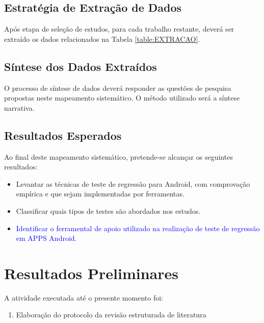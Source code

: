 \subsection{Estratégia de Extração de Dados}

Após etapa de seleção de estudos, para cada trabalho restante, deverá ser extraído os dados relacionados na Tabela \ref{table:EXTRACAO}.



\subsection{Síntese dos Dados Extraídos}

O processo de síntese de dados deverá responder as questões de pesquisa propostas neste mapeamento sistemático. O método utilizado será a síntese narrativa.


\subsection{Resultados Esperados}

Ao final deste mapeamento sistemático, pretende-se alcançar os seguintes resultados:

\begin{itemize}
    \item Levantar as técnicas de teste de regressão para Android, com comprovação empírica e que sejam implementadas por ferramentas.
    
    \item Classificar quais tipos de testes são abordados nos estudos.
    
    \item \textcolor{blue}{Identificar o ferramental de apoio utilizado na realização de teste de regressão em \ac{APPS} Android.}
\end{itemize}

\section{Resultados Preliminares}\label{sec:resultadospreliminares}

A atividade executada até o presente momento foi:

\begin{enumerate}
    
    \item Elaboração do protocolo da revisão estruturada de literatura
    
\end{enumerate}

